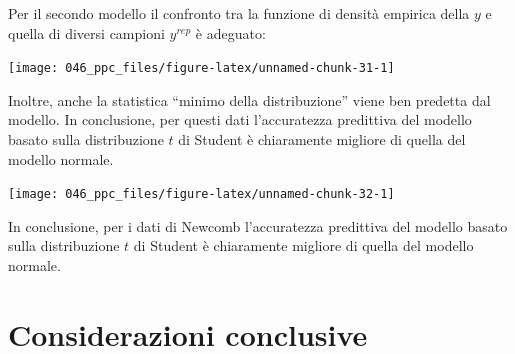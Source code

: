 \documentclass[
  10pt,
  italian,
  a4paper,
  extrafontsizes,onecolumn,openright
  ]{memoir}
\newenvironment{Shaded}{\begin{snugshade}}{\end{snugshade}}
\newcommand{\AttributeTok}[1]{\textcolor[rgb]{0.77,0.63,0.00}{#1}}
\newcommand{\DecValTok}[1]{\textcolor[rgb]{0.00,0.00,0.81}{#1}}
\newcommand{\FunctionTok}[1]{\textcolor[rgb]{0.00,0.00,0.00}{#1}}
\newcommand{\NormalTok}[1]{#1}
\newcommand{\OtherTok}[1]{\textcolor[rgb]{0.56,0.35,0.01}{#1}}
\newcommand{\SpecialCharTok}[1]{\textcolor[rgb]{0.00,0.00,0.00}{#1}}
\newcommand{\StringTok}[1]{\textcolor[rgb]{0.31,0.60,0.02}{#1}}
\begin{document}
\noindent
Per il secondo modello il confronto tra la funzione di densità empirica della \(y\) e quella di diversi campioni \(y^{rep}\) è adeguato:

\begin{Shaded}
\end{Shaded}

\begin{center}\texttt{[image: 046\_ppc\_files/figure-latex/unnamed-chunk-31-1]} \end{center}

\noindent
Inoltre, anche la statistica ``minimo della distribuzione'' viene ben predetta dal modello. In conclusione, per questi dati l'accuratezza predittiva del modello basato sulla distribuzione \(t\) di Student è chiaramente migliore di quella del modello normale.

\begin{Shaded}
\end{Shaded}

\begin{center}\texttt{[image: 046\_ppc\_files/figure-latex/unnamed-chunk-32-1]} \end{center}

\noindent
In conclusione, per i dati di Newcomb l'accuratezza predittiva del modello basato sulla distribuzione \(t\) di Student è chiaramente migliore di quella del modello normale.

\hypertarget{considerazioni-conclusive}{%
\section*{Considerazioni conclusive}\label{considerazioni-conclusive}}
\end{document}
